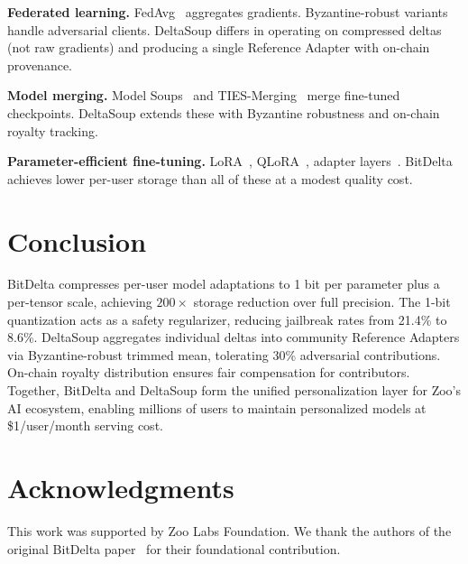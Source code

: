 \documentclass[11pt,letterpaper]{article}
\begin{document}
\textbf{Federated learning.} FedAvg~\cite{mcmahan2017federated} aggregates gradients. Byzantine-robust variants~\cite{blanchard2017machine,yin2018byzantine} handle adversarial clients. DeltaSoup differs in operating on compressed deltas (not raw gradients) and producing a single Reference Adapter with on-chain provenance.

\textbf{Model merging.} Model Soups~\cite{wortsman2022model} and TIES-Merging~\cite{yadav2023tiesmerging} merge fine-tuned checkpoints. DeltaSoup extends these with Byzantine robustness and on-chain royalty tracking.

\textbf{Parameter-efficient fine-tuning.} LoRA~\cite{hu2022lora}, QLoRA~\cite{dettmers2024qlora}, adapter layers~\cite{houlsby2019parameter}. BitDelta achieves lower per-user storage than all of these at a modest quality cost.

\section{Conclusion}

BitDelta compresses per-user model adaptations to 1 bit per parameter plus a per-tensor scale, achieving $200\times$ storage reduction over full precision. The 1-bit quantization acts as a safety regularizer, reducing jailbreak rates from 21.4\% to 8.6\%. DeltaSoup aggregates individual deltas into community Reference Adapters via Byzantine-robust trimmed mean, tolerating 30\% adversarial contributions. On-chain royalty distribution ensures fair compensation for contributors. Together, BitDelta and DeltaSoup form the unified personalization layer for Zoo's AI ecosystem, enabling millions of users to maintain personalized models at \$1/user/month serving cost.

\section*{Acknowledgments}

This work was supported by Zoo Labs Foundation. We thank the authors of the original BitDelta paper~\cite{liu2024bitdelta} for their foundational contribution.
\end{document}

